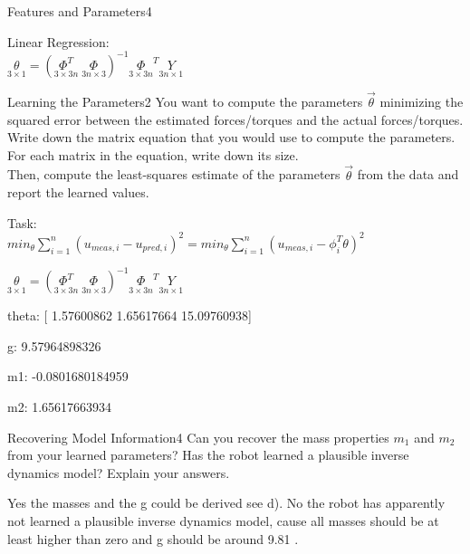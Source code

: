 \begin{questions}
\begin{question}{Features and Parameters}{4}
\begin{answer}
	Linear Regression:\\
	$\underset{3 \times 1}\theta = ( \underset{3\times 3n}{\Phi^T} \; \underset{3n \times 3}{ \Phi})^{-1} \underset{3 \times 3n}\Phi^T \underset{3n \times 1}{Y}$

	\end{answer}

\end{question}



\begin{question}{Learning the Parameters}{2}
You want to compute the parameters $\vec{\theta}$ minimizing the squared error between the estimated forces/torques and the actual forces/torques.
Write down the matrix equation that you would use to compute the parameters. For each matrix in the equation, write down its size.\\
Then, compute the least-squares estimate of the parameters $\vec{\theta}$ from the data and report the learned values.

\begin{answer}
	
	Task:\\
	$min_{\theta} \sum_{i=1}^n (u_{meas,i}-u_{pred,i})^2 =min_{\theta} \sum_{i=1}^n (u_{meas,i}-\phi^T_i \theta)^2 $
	
		$\underset{3 \times 1}\theta = ( \underset{3\times 3n}{\Phi^T} \; \underset{3n \times 3}{ \Phi})^{-1} \underset{3 \times 3n}\Phi^T \underset{3n \times 1}{Y}$
		
theta: [  1.57600862   1.65617664  15.09760938]

g: 9.57964898326

m1: -0.0801680184959

m2: 1.65617663934
	
	
	\end{answer}

\end{question}



\begin{question}{Recovering Model Information}{4}
	Can you recover the mass properties $m_{1}$ and $m_{2}$ from your learned parameters? Has the robot learned a plausible inverse dynamics model? Explain your answers.
	
\begin{answer}
	Yes the masses and the g could be derived see d). No the robot has apparently not learned a plausible inverse dynamics model, cause all masses should be at least higher than zero and g should be around 9.81 . 
	\end{answer}
\end{question}


\end{questions}
